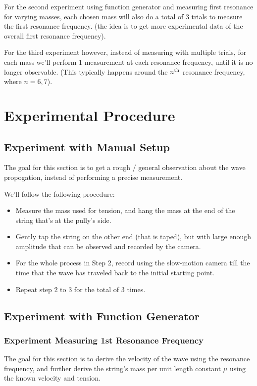 \documentclass{article}
\begin{document}
For the second experiment using function generator and measuring first resonance for varying masses, each chosen mass will also do a total of $3$ trials to measure the first resonance frequency. (the idea is to get more experimental data of the overall first resonance frequency).

For the third experiment however, instead of measuring with multiple trials, for each mass we'll perform 1 measurement at each resonance frequency, until it is no longer observable. (This typically happens around the $n^\textmd{th}$ resonance frequency, where $n=6,7$).

\hfil

\section{Experimental Procedure}
\subsection{Experiment with Manual Setup}
The goal for this section is to get a rough / general observation about the wave propogation, instead of performing a precise measurement.

We'll follow the following procedure:
\begin{itemize}
    \item[1.] Measure the mass used for tension, and hang the mass at the end of the string that's at the pully's side.
    \item[2.] Gently tap the string on the other end (that is taped), but with large enough amplitude that can be observed and recorded by the camera.
    \item[3.] For the whole process in Step 2, record using the slow-motion camera till the time that the wave has traveled back to the initial starting point.
    \item[4.] Repeat step 2 to 3 for the total of 3 times.   
\end{itemize}

\subsection{Experiment with Function Generator}
\subsubsection{Experiment Measuring 1st Resonance Frequency}
The goal for this section is to derive the velocity of the wave using the resonance frequency, and further derive the string's mass per unit length constant $\mu$ using the known velocity and tension.
\end{document}

